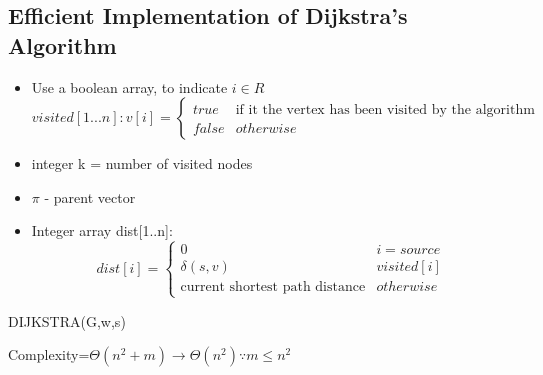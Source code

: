 \documentclass[12pt,letterpaper]{article}
\begin{document}
\subsection{Efficient Implementation of Dijkstra's Algorithm}
\begin{itemize}
\item Use a boolean array, to indicate $i\in R$
\[visited[1...n]:v[i]=\begin{cases}true & \text{if it the vertex has been visited by the algorithm}\\ false & otherwise \end{cases}\] 
\item integer k = number of visited nodes
\item $\pi$ - parent vector
\item Integer array dist[1..n]:
\[dist[i]=\begin{cases} 0 & i=source \\ \delta(s,v) & visited[i] \\ \text{current shortest path distance}& otherwise\end{cases}\]
\end{itemize}
\begin{algorithm}[h]
DIJKSTRA(G,w,s)
\end{algorithm}
Complexity=$\Theta(n^2+m)\to \Theta(n^2)\because m\leq n^2$
\FloatBarrier
\end{document}
